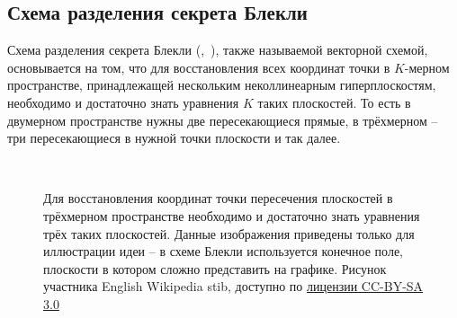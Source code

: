 \subsection[Схема Блекли]{Схема разделения секрета Блекли}

Схема разделения секрета Блекли (,~\cite{Blackley:1979}), также называемой векторной схемой, основывается на том, что для восстановления всех координат точки в $K$-мерном пространстве, принадлежащей нескольким неколлинеарным гиперплоскостям, необходимо и достаточно знать уравнения $K$ таких плоскостей. То есть в двумерном пространстве нужны две пересекающиеся прямые, в трёхмерном -- три пересекающиеся в нужной точки плоскости и так далее.

\begin{figure}[thb]
	\centering
	~~~~
	\caption{Для восстановления координат точки пересечения плоскостей в трёхмерном пространстве необходимо и достаточно знать уравнения трёх таких плоскостей. Данные изображения приведены только для иллюстрации идеи -- в схеме Блекли используется конечное поле, плоскости в котором сложно представить на графике. Рисунок участника English Wikipedia stib, доступно по \href{https://creativecommons.org/licenses/by-sa/3.0/deed.ru}{лицензии CC-BY-SA 3.0}}
\end{figure}

